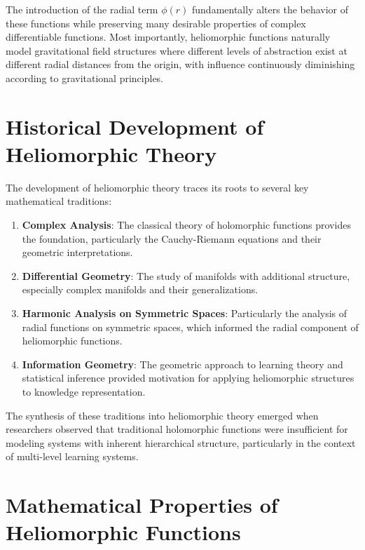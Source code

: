 The introduction of the radial term $\phi(r)$ fundamentally alters the behavior of these functions while preserving many desirable properties of complex differentiable functions. Most importantly, heliomorphic functions naturally model gravitational field structures where different levels of abstraction exist at different radial distances from the origin, with influence continuously diminishing according to gravitational principles.

\section{Historical Development of Heliomorphic Theory}

The development of heliomorphic theory traces its roots to several key mathematical traditions:

\begin{enumerate}
    \item \textbf{Complex Analysis}: The classical theory of holomorphic functions provides the foundation, particularly the Cauchy-Riemann equations and their geometric interpretations.
    
    \item \textbf{Differential Geometry}: The study of manifolds with additional structure, especially complex manifolds and their generalizations.
    
    \item \textbf{Harmonic Analysis on Symmetric Spaces}: Particularly the analysis of radial functions on symmetric spaces, which informed the radial component of heliomorphic functions.
    
    \item \textbf{Information Geometry}: The geometric approach to learning theory and statistical inference provided motivation for applying heliomorphic structures to knowledge representation.
\end{enumerate}

The synthesis of these traditions into heliomorphic theory emerged when researchers observed that traditional holomorphic functions were insufficient for modeling systems with inherent hierarchical structure, particularly in the context of multi-level learning systems.

\section{Mathematical Properties of Heliomorphic Functions}

